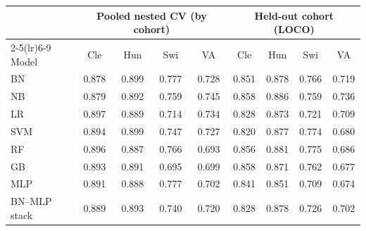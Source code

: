 \begin{tabular}{lcccccccc}
\toprule
 & \multicolumn{4}{c}{Pooled nested CV (by cohort)} & \multicolumn{4}{c}{Held-out cohort (LOCO)} \\
\cmidrule(lr){2-5}\cmidrule(lr){6-9}
Model & Cle & Hun & Swi & VA & Cle & Hun & Swi & VA \\
\midrule
BN & 0.878 & 0.899 & 0.777 & 0.728 & 0.851 & 0.878 & 0.766 & 0.719 \\
NB & 0.879 & 0.892 & 0.759 & 0.745 & 0.858 & 0.886 & 0.759 & 0.736 \\
LR & 0.897 & 0.889 & 0.714 & 0.734 & 0.828 & 0.873 & 0.721 & 0.709 \\
SVM & 0.894 & 0.899 & 0.747 & 0.727 & 0.820 & 0.877 & 0.774 & 0.680 \\
RF & 0.896 & 0.887 & 0.766 & 0.693 & 0.856 & 0.881 & 0.775 & 0.686 \\
GB & 0.893 & 0.891 & 0.695 & 0.699 & 0.858 & 0.871 & 0.762 & 0.677 \\
\midrule
MLP & 0.891 & 0.888 & 0.777 & 0.702 & 0.841 & 0.851 & 0.709 & 0.674 \\
BN--MLP stack & 0.889 & 0.893 & 0.740 & 0.720 & 0.828 & 0.878 & 0.726 & 0.702 \\
\bottomrule
\end{tabular}
